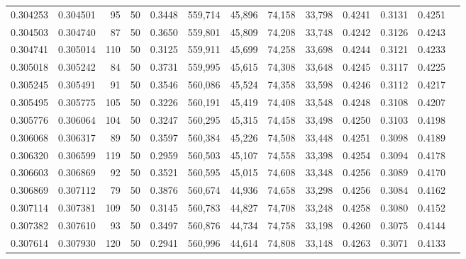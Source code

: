 \begin{tabular}{rrrrrrrrrrrrr}
0.304253 & 0.304501 &    95 &  50 &                                     0.3448 & 559,714 &  45,896 &  74,158 &  33,798 & 0.4241 & 0.3131 & 0.4251 \\
0.304503 & 0.304740 &    87 &  50 &                                     0.3650 & 559,801 &  45,809 &  74,208 &  33,748 & 0.4242 & 0.3126 & 0.4243 \\
0.304741 & 0.305014 &   110 &  50 &                                     0.3125 & 559,911 &  45,699 &  74,258 &  33,698 & 0.4244 & 0.3121 & 0.4233 \\
0.305018 & 0.305242 &    84 &  50 &                                     0.3731 & 559,995 &  45,615 &  74,308 &  33,648 & 0.4245 & 0.3117 & 0.4225 \\
0.305245 & 0.305491 &    91 &  50 &                                     0.3546 & 560,086 &  45,524 &  74,358 &  33,598 & 0.4246 & 0.3112 & 0.4217 \\
0.305495 & 0.305775 &   105 &  50 &                                     0.3226 & 560,191 &  45,419 &  74,408 &  33,548 & 0.4248 & 0.3108 & 0.4207 \\
0.305776 & 0.306064 &   104 &  50 &                                     0.3247 & 560,295 &  45,315 &  74,458 &  33,498 & 0.4250 & 0.3103 & 0.4198 \\
0.306068 & 0.306317 &    89 &  50 &                                     0.3597 & 560,384 &  45,226 &  74,508 &  33,448 & 0.4251 & 0.3098 & 0.4189 \\
0.306320 & 0.306599 &   119 &  50 &                                     0.2959 & 560,503 &  45,107 &  74,558 &  33,398 & 0.4254 & 0.3094 & 0.4178 \\
0.306603 & 0.306869 &    92 &  50 &                                     0.3521 & 560,595 &  45,015 &  74,608 &  33,348 & 0.4256 & 0.3089 & 0.4170 \\
0.306869 & 0.307112 &    79 &  50 &                                     0.3876 & 560,674 &  44,936 &  74,658 &  33,298 & 0.4256 & 0.3084 & 0.4162 \\
0.307114 & 0.307381 &   109 &  50 &                                     0.3145 & 560,783 &  44,827 &  74,708 &  33,248 & 0.4258 & 0.3080 & 0.4152 \\
0.307382 & 0.307610 &    93 &  50 &                                     0.3497 & 560,876 &  44,734 &  74,758 &  33,198 & 0.4260 & 0.3075 & 0.4144 \\
0.307614 & 0.307930 &   120 &  50 &                                     0.2941 & 560,996 &  44,614 &  74,808 &  33,148 & 0.4263 & 0.3071 & 0.4133 \\

\end{tabular}
